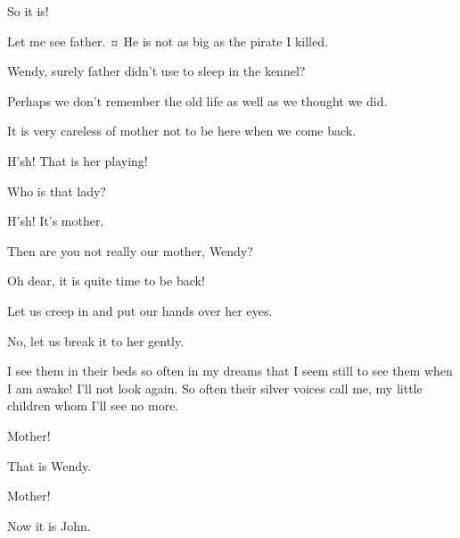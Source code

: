 \begin{drama}
\johnspeaks
So it is!

\michaelspeaks
Let me see father.
¤
He is not as big as the pirate I killed.

Wendy, surely father didn’t use to sleep in the kennel?

Perhaps we don’t remember the old life as well as we thought we did.

It is very careless of mother not to be here when we come back.


\wendyspeaks
H’sh!
That is her playing!

\michaelspeaks
Who is that lady?

\johnspeaks
H’sh!
It’s mother.

\michaelspeaks
Then are you not really our mother, Wendy?

Oh dear, it is quite time to be back!

\johnspeaks
Let us creep in and put our hands over her eyes.

No, let us break it to her gently.


\mrsdarlingspeaks
I see them in their beds so often in my dreams that I seem still to see them when I am awake!
I’ll not look again.
So often their silver voices call me, my little children whom I’ll see no more.


Mother!

That is Wendy.

Mother!

\mrsdarlingspeaks
Now it is John.


\end{drama}
